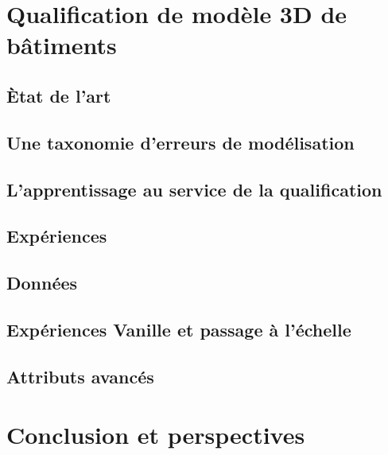 \section*{Qualification de modèle 3D de bâtiments}

    
    \subsection*{\`Etat de l'art}

    \subsection*{Une taxonomie d'erreurs de modélisation}

    \subsection*{L'apprentissage au service de la qualification}

\subsection*{Expériences}

    \subsection*{Données}

    \subsection*{Expériences Vanille et passage à l'échelle}

    \subsection*{Attributs avancés}

\section*{Conclusion et perspectives}

